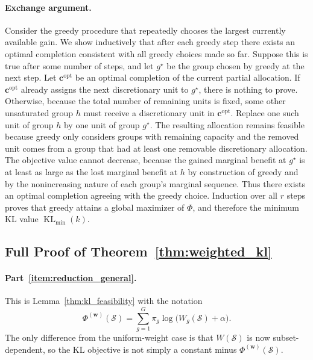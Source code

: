 \documentclass[10pt,journal]{IEEEtran}
\newcommand{\1}{\mathbf{1}}
\newcommand{\bw}{\mathbf{w}}
\newcommand{\bc}{\mathbf{c}}
\newcommand{\Sel}{\mathcal{S}}
\DeclareMathOperator{\KL}{KL}
\theoremstyle{ieeethm}
\begin{document}
\paragraph{Exchange argument.}
Consider the greedy procedure that repeatedly chooses the largest currently available gain. We show inductively that after each greedy step there exists an optimal completion consistent with all greedy choices made so far. Suppose this is true after some number of steps, and let $g^\star$ be the group chosen by greedy at the next step. Let $\bc^{\mathrm{opt}}$ be an optimal completion of the current partial allocation. If $\bc^{\mathrm{opt}}$ already assigns the next discretionary unit to $g^\star$, there is nothing to prove. Otherwise, because the total number of remaining units is fixed, some other unsaturated group $h$ must receive a discretionary unit in $\bc^{\mathrm{opt}}$. Replace one such unit of group $h$ by one unit of group $g^\star$. The resulting allocation remains feasible because greedy only considers groups with remaining capacity and the removed unit comes from a group that had at least one removable discretionary allocation. The objective value cannot decrease, because the gained marginal benefit at $g^\star$ is at least as large as the lost marginal benefit at $h$ by construction of greedy and by the nonincreasing nature of each group's marginal sequence. Thus there exists an optimal completion agreeing with the greedy choice. Induction over all $r$ steps proves that greedy attains a global maximizer of $\Phi$, and therefore the minimum KL value $\KL_{\min}(k)$.

\subsection{Full Proof of Theorem~\ref{thm:weighted_kl}}

\paragraph{Part~\ref{item:reduction_general}.}
This is Lemma~\ref{thm:kl_feasibility} with the notation
\[
\Phi^{(\bw)}(\Sel)=\sum_{g=1}^{G}\pi_g\log\big(W_g(\Sel)+\alpha\big).
\]
The only difference from the uniform-weight case is that $W(\Sel)$ is now subset-dependent, so the KL objective is not simply a constant minus $\Phi^{(\bw)}(\Sel)$.
\end{document}
